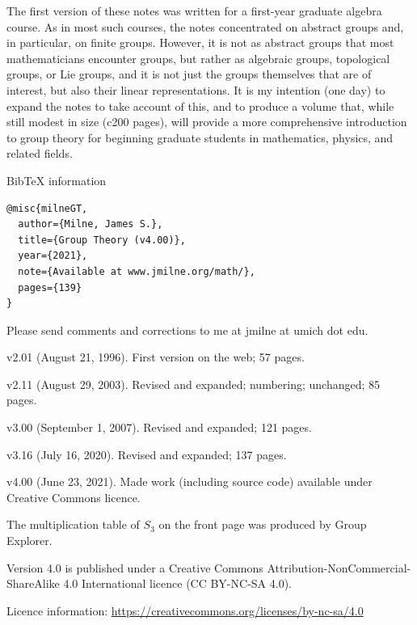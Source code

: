 \documentclass[a4paper,11pt,final,openany]{memoir}%
\theoremstyle{nonumberplain}
\begin{document}
\noindent The first version of these notes was written for a first-year
graduate algebra course. As in most such courses, the notes concentrated on
abstract groups and, in particular, on finite groups. However, it is not as
abstract groups that most mathematicians encounter groups, but rather as
algebraic groups, topological groups, or Lie groups, and it is not just the
groups themselves that are of interest, but also their linear representations.
It is my intention (one day) to expand the notes to take account of this, and
to produce a volume that, while still modest in size (c200 pages), will
provide a more comprehensive introduction to group theory for beginning
graduate students in mathematics, physics, and related fields.

\vfill \noindent BibTeX information
\begin{small}
\begin{verbatim}
@misc{milneGT,
  author={Milne, James S.},
  title={Group Theory (v4.00)},
  year={2021},
  note={Available at www.jmilne.org/math/},
  pages={139}
}
\end{verbatim}
\end{small}

\vfill


\noindent Please send comments and corrections to me at jmilne at umich dot edu.

\noindent v2.01 (August 21, 1996). First version on the web; 57 pages.

\noindent v2.11 (August 29, 2003). Revised and expanded; numbering; unchanged; 85 pages.

\noindent v3.00 (September 1, 2007). Revised and expanded; 121 pages.

\noindent v3.16 (July 16, 2020). Revised and expanded; 137 pages.

\noindent v4.00 (June 23, 2021). Made work (including source code) available
under Creative Commons licence.
\vfill


\noindent The multiplication table of $S_{3}$ on the front page was produced
by Group Explorer. \vfill

\noindent Version 4.0 is published under a Creative Commons
Attribution-NonCommercial-ShareAlike 4.0 International licence
(CC BY-NC-SA 4.0).

\bigskip

\noindent Licence information:
\href{https://creativecommons.org/licenses/by-nc-sa/4.0/}{https://creativecommons.org/licenses/by-nc-sa/4.0}

\bigskip
\end{document}
